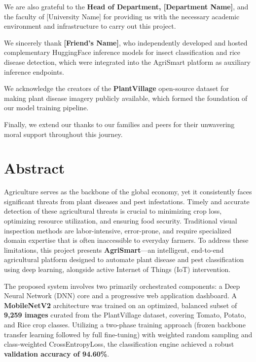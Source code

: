 \documentclass[12pt,a4paper]{report}
\begin{document}
We are also grateful to the \textbf{Head of Department, [Department Name]}, and the faculty of [University Name] for providing us with the necessary academic environment and infrastructure to carry out this project.

We sincerely thank \textbf{[Friend's Name]}, who independently developed and hosted complementary HuggingFace inference models for insect classification and rice disease detection, which were integrated into the AgriSmart platform as auxiliary inference endpoints.

We acknowledge the creators of the \textbf{PlantVillage} open-source dataset for making plant disease imagery publicly available, which formed the foundation of our model training pipeline.

Finally, we extend our thanks to our families and peers for their unwavering moral support throughout this journey.

\newpage

\chapter*{Abstract}
\thispagestyle{plain}

Agriculture serves as the backbone of the global economy, yet it consistently faces significant threats from plant diseases and pest infestations. Timely and accurate detection of these agricultural threats is crucial to minimizing crop loss, optimizing resource utilization, and ensuring food security. Traditional visual inspection methods are labor-intensive, error-prone, and require specialized domain expertise that is often inaccessible to everyday farmers. To address these limitations, this project presents \textbf{AgriSmart}---an intelligent, end-to-end agricultural platform designed to automate plant disease and pest classification using deep learning, alongside active Internet of Things (IoT) intervention.

The proposed system involves two primarily orchestrated components: a Deep Neural Network (DNN) core and a progressive web application dashboard. A \textbf{MobileNetV2} architecture was trained on an optimized, balanced subset of \textbf{9,259 images} curated from the PlantVillage dataset, covering Tomato, Potato, and Rice crop classes. Utilizing a two-phase training approach (frozen backbone transfer learning followed by full fine-tuning) with weighted random sampling and class-weighted CrossEntropyLoss, the classification engine achieved a robust \textbf{validation accuracy of 94.60\%}.
\end{document}
